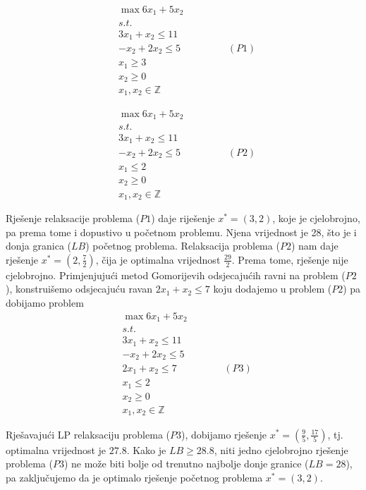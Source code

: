 \documentclass[a4paper, utf8, 11pt, colorlinks]{book}
\begin{document}
\begin{align*}
    &\max 6 x_1 + 5 x_2 \\
    & {s.t. } \\
    & 3x_1 + x_2 \leq 11 \\
    & - x_2 + 2 x_2 \leq 5 \hspace{2cm} (P1) \\
    & x_1 \geq 3 \\
    & x_2 \geq 0 \\
    & x_1, x_2 \in \mathbb{Z}
\end{align*}

\begin{align*}
    &\max 6 x_1 + 5 x_2 \\
    & {s.t. } \\
    & 3x_1 + x_2 \leq 11 \\
    & - x_2 + 2 x_2 \leq 5 \hspace{2cm} (P2) \\
    & x_1  \leq 2 \\
    & x_2 \geq 0 \\
    & x_1, x_2 \in \mathbb{Z}
\end{align*}

Rješenje relaksacije problema ($P1$) daje riješenje $x^*=(3,2)$, koje je cjelobrojno, pa prema tome i dopustivo u početnom problemu. Njena vrijednost je 28, što je i donja granica ($LB$) početnog problema. Relaksacija problema ($P2$) nam daje rješenje $x^*=(2, \frac{7}{2})$, čija je optimalna vrijednost $\frac{29}{2}$.  Prema tome, rješenje nije cjelobrojno. Primjenjujući metod Gomorijevih odsjecajućih ravni na problem ($P2$), konstruišemo odsjecajuću ravan $2x_1 + x_2 \leq 7$ koju dodajemo u problem ($P2$) pa dobijamo problem 
\begin{align*}
    &\max 6 x_1 + 5 x_2 \\
    & {s.t. } \\
    & 3x_1 + x_2 \leq 11 \\
    & - x_2 + 2 x_2 \leq 5  \\
    & 2x_1 + x_2 \leq 7 \hspace{2cm} (P3)\\ 
    & x_1  \leq 2 \\
    & x_2 \geq 0 \\
    & x_1, x_2 \in \mathbb{Z}
\end{align*}

Rješavajući LP relaksaciju problema ($P3$), dobijamo rješenje $x^*=(\frac{9}{5}, \frac{17}{5})$, tj.  optimalna vrijednost je $27.8$. Kako je $LB \geq 28.8$, niti jedno cjelobrojno rješenje problema ($P3$) ne može biti bolje od trenutno najbolje donje granice ($LB=28$), pa zaključujemo da je optimalo rješenje početnog problema $x^*=(3,2)$. 
\end{document}
